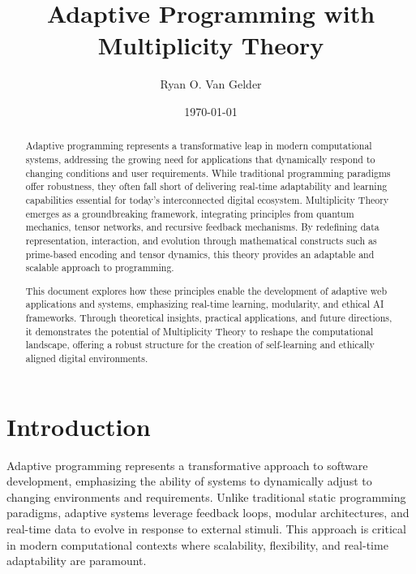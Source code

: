 \documentclass{article}
\theoremstyle{plain}
\begin{document}
\title{Adaptive Programming with Multiplicity Theory}

\author{Ryan O. Van Gelder}
\date{\today}

\maketitle
\begin{abstract}
Adaptive programming represents a transformative leap in modern computational systems, addressing the growing need for applications that dynamically respond to changing conditions and user requirements. While traditional programming paradigms offer robustness, they often fall short of delivering real-time adaptability and learning capabilities essential for today’s interconnected digital ecosystem. Multiplicity Theory emerges as a groundbreaking framework, integrating principles from quantum mechanics, tensor networks, and recursive feedback mechanisms. By redefining data representation, interaction, and evolution through mathematical constructs such as prime-based encoding and tensor dynamics, this theory provides an adaptable and scalable approach to programming.

This document explores how these principles enable the development of adaptive web applications and systems, emphasizing real-time learning, modularity, and ethical AI frameworks. Through theoretical insights, practical applications, and future directions, it demonstrates the potential of Multiplicity Theory to reshape the computational landscape, offering a robust structure for the creation of self-learning and ethically aligned digital environments.
\end{abstract}

\section{Introduction}

Adaptive programming represents a transformative approach to software development, emphasizing the ability of systems to dynamically adjust to changing environments and requirements\cite{schuld2019supervised}.
Unlike traditional static programming paradigms, adaptive systems leverage feedback loops, modular architectures, and real-time data to evolve in response to external stimuli. This approach is critical in modern computational contexts where scalability, flexibility, and real-time adaptability are paramount\cite{preskill2018quantum}.
\end{document}
